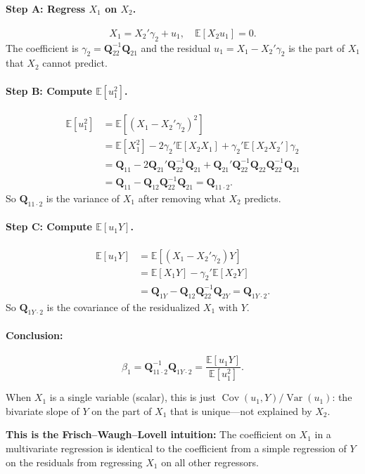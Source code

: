 \documentclass[12pt]{article}
\newcommand{\E}{\mathbb{E}}
\newcommand{\Var}{\operatorname{Var}}
\newcommand{\Cov}{\operatorname{Cov}}
\newcommand{\bfQ}{\mathbf{Q}}
\theoremstyle{definition}
\begin{document}
\paragraph{Step A: Regress $X_1$ on $X_2$.}
\[
X_1 = X_2'\gamma_2 + u_1, \quad \E[X_2 u_1] = 0.
\]
The coefficient is $\gamma_2 = \bfQ_{22}^{-1}\bfQ_{21}$ and the residual $u_1 = X_1 - X_2'\gamma_2$ is the part of $X_1$ that $X_2$ cannot predict.

\paragraph{Step B: Compute $\E[u_1^2]$.}
\begin{align*}
\E[u_1^2] &= \E[(X_1 - X_2'\gamma_2)^2]\\
&= \E[X_1^2] - 2\gamma_2'\E[X_2 X_1] + \gamma_2'\E[X_2 X_2']\gamma_2\\
&= \bfQ_{11} - 2\bfQ_{21}'\bfQ_{22}^{-1}\bfQ_{21} + \bfQ_{21}'\bfQ_{22}^{-1}\bfQ_{22}\bfQ_{22}^{-1}\bfQ_{21}\\
&= \bfQ_{11} - \bfQ_{12}\bfQ_{22}^{-1}\bfQ_{21} = \bfQ_{11\cdot 2}.
\end{align*}
So $\bfQ_{11\cdot 2}$ is the variance of $X_1$ after removing what $X_2$ predicts.

\paragraph{Step C: Compute $\E[u_1 Y]$.}
\begin{align*}
\E[u_1 Y] &= \E[(X_1 - X_2'\gamma_2)Y]\\
&= \E[X_1 Y] - \gamma_2'\E[X_2 Y]\\
&= \bfQ_{1Y} - \bfQ_{12}\bfQ_{22}^{-1}\bfQ_{2Y} = \bfQ_{1Y\cdot 2}.
\end{align*}
So $\bfQ_{1Y\cdot 2}$ is the covariance of the residualized $X_1$ with $Y$.

\paragraph{Conclusion:}
\begin{equation}
\beta_1 = \bfQ_{11\cdot 2}^{-1}\bfQ_{1Y\cdot 2} = \frac{\E[u_1 Y]}{\E[u_1^2]}.
\end{equation}

When $X_1$ is a single variable (scalar), this is just $\Cov(u_1, Y)/\Var(u_1)$: the bivariate slope of $Y$ on the part of $X_1$ that is unique---not explained by $X_2$.

\textbf{This is the Frisch--Waugh--Lovell intuition:} The coefficient on $X_1$ in a multivariate regression is identical to the coefficient from a simple regression of $Y$ on the residuals from regressing $X_1$ on all other regressors.
\end{document}
